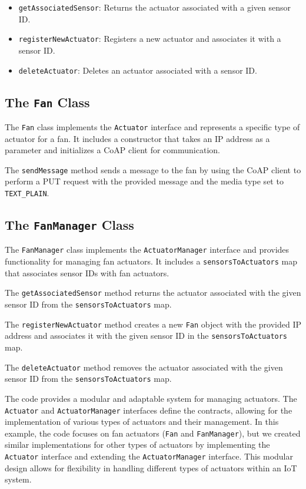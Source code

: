 \documentclass[parskip=full]{report}
\begin{document}
		\begin{itemize}
			\item \texttt{getAssociatedSensor}: Returns the actuator associated with a given sensor ID.
			\item \texttt{registerNewActuator}: Registers a new actuator and associates it with a sensor ID.
			\item \texttt{deleteActuator}: Deletes an actuator associated with a sensor ID.
		\end{itemize}
		
		\subsection{The \texttt{Fan} Class}
		
		The \texttt{Fan} class implements the \texttt{Actuator} interface and represents a specific type of actuator for a fan. It includes a constructor that takes an IP address as a parameter and initializes a CoAP client for communication.
		
		The \texttt{sendMessage} method sends a message to the fan by using the CoAP client to perform a PUT request with the provided message and the media type set to \texttt{TEXT\_PLAIN}.
		
		\subsection{The \texttt{FanManager} Class}
		
		The \texttt{FanManager} class implements the \texttt{ActuatorManager} interface and provides functionality for managing fan actuators. It includes a \texttt{sensorsToActuators} map that associates sensor IDs with fan actuators.
		
		The \texttt{getAssociatedSensor} method returns the actuator associated with the given sensor ID from the \texttt{sensorsToActuators} map.
		
		The \texttt{registerNewActuator} method creates a new \texttt{Fan} object with the provided IP address and associates it with the given sensor ID in the \texttt{sensorsToActuators} map.
		
		The \texttt{deleteActuator} method removes the actuator associated with the given sensor ID from the \texttt{sensorsToActuators} map.
		
		The code provides a modular and adaptable system for managing actuators. The \texttt{Actuator} and \texttt{ActuatorManager} interfaces define the contracts, allowing for the implementation of various types of actuators and their management. In this example, the code focuses on fan actuators (\texttt{Fan} and \texttt{FanManager}), but we created similar implementations for other types of actuators by implementing the \texttt{Actuator} interface and extending the \texttt{ActuatorManager} interface. This modular design allows for flexibility in handling different types of actuators within an IoT system.
\end{document}
